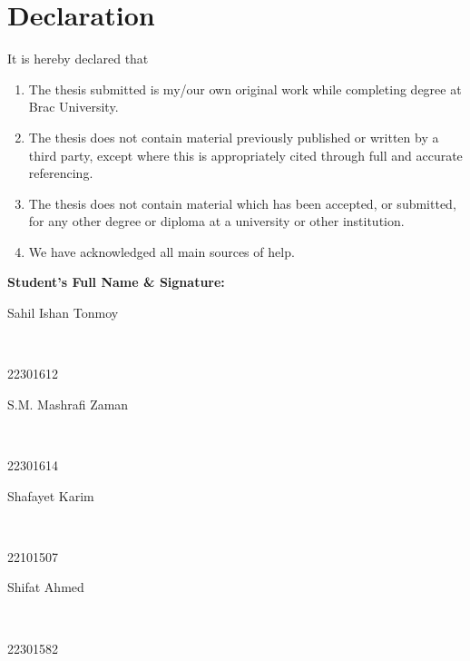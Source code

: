 \newcommand*\wildcard[2][6cm]{\vspace{2cm}\parbox{#1}{\hrulefill\par#2}} 


\section*{Declaration}

It is hereby declared that

\begin{enumerate} %
  \item The thesis submitted is my/our own original work while completing degree at Brac University.
  \item The thesis does not contain material previously published or written by a third party, except where this is appropriately cited through full and accurate referencing.
  \item The thesis does not contain material which has been accepted, or submitted, for any other degree or diploma at a university or other institution.
  \item We have acknowledged all main sources of help.
\end{enumerate}

\vspace{1cm}
\textbf{Student’s Full Name \& Signature:} %

\begingroup

    \begin{center}
        \wildcard{\centerline{Sahil Ishan Tonmoy} ~\\ \centerline{22301612}} %
        \hspace{2cm} %
        \wildcard{\centerline{S.M. Mashrafi Zaman} ~\\ \centerline{22301614} }
        \wildcard{\centerline{Shafayet Karim} ~\\ \centerline{22101507} }
        \hspace{2cm}
        \wildcard{\centerline{Shifat Ahmed} ~\\ \centerline{22301582} }
    \end{center}

\endgroup


\pagebreak





